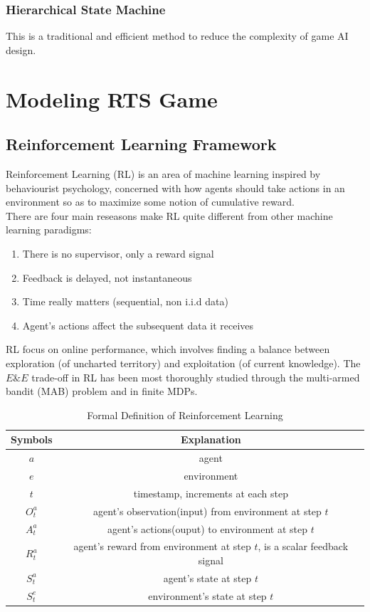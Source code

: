 \documentclass{llncs}
\begin{document}
\subsubsection{Hierarchical State Machine}
This is a traditional and efficient method to reduce the complexity of game AI design.

\section{Modeling RTS Game}
\subsection{Reinforcement Learning Framework}
Reinforcement Learning (RL) is an area of machine learning inspired by behaviourist psychology, concerned with how agents should take actions in an environment so as to maximize some notion of cumulative reward.\\
There are four main reseasons make RL quite different from other machine learning paradigms:\cite{David_Silver:intro_RL}
\begin{enumerate}
\item There is no supervisor, only a reward signal
\item Feedback is delayed, not instantaneous
\item Time really matters (sequential, non i.i.d data)
\item Agent’s actions affect the subsequent data it receives
\end{enumerate}
RL focus on online performance, which involves finding a balance between exploration (of uncharted territory) and exploitation (of current knowledge). The $E\&E$ trade-off in RL has been most thoroughly studied through the multi-armed bandit (MAB) problem and in finite MDPs.

\begin{table}[H]
\caption{Formal Definition of Reinforcement Learning\cite{David_Silver:intro_RL}}
\centering
\begin{tabular}{c c} %
\hline Symbols & Explanation \\[0ex] \hline
$a$ 	& agent \\
$e$ 	& environment \\
$t$ 	& timestamp, increments at each step \\
$O_t^a$ & agent's observation(input) from environment at step $t$ \\
$A_t^a$ & agent's actions(ouput) to environment at step $t$ \\
$R_t^a$ & agent's reward from environment at step $t$, is a scalar feedback signal \\
$S_t^a$ & agent's state at step $t$ \\
$S_t^e$ & environment's state at step $t$ \\
\end{tabular}
\label{table:srl}
\end{table}
\end{document}
